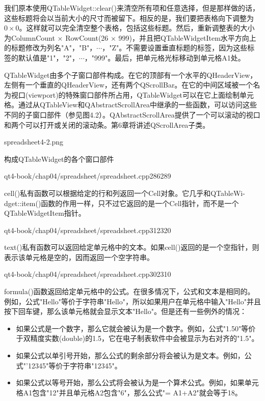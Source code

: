 \documentclass[11pt,oneside]{book}
\begin{document}
\begin{common-format}
我们原本使用QTableWidget::clear()来清空所有项和任意选择，但是那样做的话，这些标题将会以当前大小的尺寸而被留下。相反的是，我们要把表格向下调整为$ 0\times 0 $。这样就可以完全清空整个表格，包括这些标题。然后，重新调整表的大小为ColumnCount × RowCount(26 × 999)，并且把QTableWidgetItem水平方向上的标题修改为列名"A"，"B"，$ \cdots $，"Z"。不需要设置垂直标题的标签，因为这些标签的默认值是"1"，"2"，$ \cdots $，"999"。最后，把单元格光标移动到单元格A1处。

QTableWidget由多个子窗口部件构成。在它的顶部有一个水平的QHeaderView，左侧有一个垂直的QHeaderView，还有两个QScrollBar。在它的中间区域被一个名为视口(viewport)的特殊窗口部件所占用，QTableWidget可以在它上面绘制单元格。通过从QTableView和QAbstractScrollArea中继承的一些函数，可以访问这些不同的子窗口部件（参见图4.2）。QAbstractScrollArea提供了一个可以滚动的视口和两个可以打开或关闭的滚动条。第6章将讲述QScrollArea子类。

\begin{linefig}[0.7]{spreadsheet4-2.png}
\caption{构成QTableWidget的各个窗口部件}
\label{fig:spreadsheet4-2.png}
\end{linefig}

\begin{cppline}{qt4-book/chap04/spreadsheet/spreadsheet.cpp}{286}{289}
\end{cppline}

cell()私有函数可以根据给定的行和列返回一个Cell对象。它几乎和QTableWi-dget::item()函数的作用一样，只不过它返回的是一个Cell指针，而不是一个QTableWidgetItem指针。

\begin{cppline}{qt4-book/chap04/spreadsheet/spreadsheet.cpp}{312}{320}
\end{cppline}

text()私有函数可以返回给定单元格中的文本。如果cell()返回的是一个空指针，则表示该单元格是空的，因而返回一个空字符串。

\begin{cppline}{qt4-book/chap04/spreadsheet/spreadsheet.cpp}{302}{310}
\end{cppline}

formula()函数返回给定单元格中的公式。在很多情况下，公式和文本是相同的。例如，公式"Hello"等价于字符串"Hello"，所以如果用户在单元格中输入"Hello"并且按下回车键，那么该单元格就会显示文本"Hello"。但是还有一些例外的情况：
\begin{itemize}
\item 如果公式是一个数字，那么它就会被认为是一个数字。例如，公式"1.50"等价于双精度实数(double)的1.5，它在电子制表软件中会被显示为右对齐的"1.5"。
\item 如果公式以单引号开始，那么公式的剩余部分将会被认为是文本。例如，公式"'12345"等价于字符串"12345"。
\item 如果公式以等号开始，那么公式将会被认为是一个算术公式。例如，如果单元格A1包含"12"并且单元格A2包含"6"，那么公式"= A1+A2"就会等于18。
\end{itemize}


\end{common-format}
\end{document}
